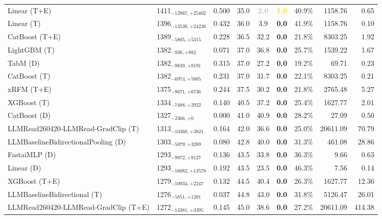 \begin{tabular}{llcccccrr}
Linear (T+E) & 1411${}_{-12867,+25402}$ & 0.500 & 35.0 & \textcolor{silver}{\textbf{2.0}} & \textcolor{gold}{\textbf{1.0}} & 40.9\% & 1158.76 & 0.65 \\
Linear (T) & 1396${}_{-13538,+24236}$ & 0.432 & 36.0 & 3.9 & \textcolor{bronze}{\textbf{0.0}} & 41.9\% & 1158.76 & 0.10 \\
CatBoost (T+E) & 1389${}_{-5805,+5315}$ & 0.228 & 36.5 & 32.2 & \textcolor{bronze}{\textbf{0.0}} & 21.8\% & 8303.25 & 1.92 \\
LightGBM (T) & 1382${}_{-938,+882}$ & 0.071 & 37.0 & 36.8 & \textcolor{bronze}{\textbf{0.0}} & 25.7\% & 1539.22 & 1.67 \\
TabM (D) & 1382${}_{-9839,+8191}$ & 0.315 & 37.0 & 27.2 & \textcolor{bronze}{\textbf{0.0}} & 19.2\% & 69.71 & 0.23 \\
CatBoost (T) & 1382${}_{-6974,+5805}$ & 0.231 & 37.0 & 31.7 & \textcolor{bronze}{\textbf{0.0}} & 22.1\% & 8303.25 & 0.21 \\
xRFM (T+E) & 1375${}_{-8671,+6736}$ & 0.244 & 37.5 & 30.2 & \textcolor{bronze}{\textbf{0.0}} & 21.8\% & 2765.48 & 5.27 \\
XGBoost (T) & 1334${}_{-7488,+2922}$ & 0.140 & 40.5 & 37.2 & \textcolor{bronze}{\textbf{0.0}} & 25.4\% & 1627.77 & 2.01 \\
CatBoost (D) & 1327${}_{-2366,+0}$ & 0.000 & 41.0 & 40.9 & \textcolor{bronze}{\textbf{0.0}} & 28.2\% & 27.09 & 0.50 \\
LLMRead260420-LLMRead-GradClip (T) & 1313${}_{-10368,+3821}$ & 0.164 & 42.0 & 36.6 & \textcolor{bronze}{\textbf{0.0}} & 25.0\% & 20611.09 & 70.79 \\
LLMBaselineBidirectionalPooling (D) & 1303${}_{-5879,+3289}$ & 0.080 & 42.8 & 40.0 & \textcolor{bronze}{\textbf{0.0}} & 31.3\% & 461.08 & 28.86 \\
FastaiMLP (D) & 1293${}_{-9872,+8127}$ & 0.136 & 43.5 & 33.8 & \textcolor{bronze}{\textbf{0.0}} & 36.3\% & 9.66 & 0.63 \\
Linear (D) & 1293${}_{-16082,+13578}$ & 0.192 & 43.5 & 23.5 & \textcolor{bronze}{\textbf{0.0}} & 46.3\% & 7.56 & 0.14 \\
XGBoost (T+E) & 1279${}_{-10934,+2247}$ & 0.132 & 44.5 & 40.4 & \textcolor{bronze}{\textbf{0.0}} & 26.3\% & 1627.77 & 12.36 \\
LLMBaselineBidirectional (T) & 1276${}_{-5851,+1201}$ & 0.037 & 44.8 & 43.0 & \textcolor{bronze}{\textbf{0.0}} & 31.8\% & 5126.47 & 26.01 \\
LLMRead260420-LLMRead-GradClip (T+E) & 1272${}_{-13381,+3395}$ & 0.145 & 45.0 & 38.6 & \textcolor{bronze}{\textbf{0.0}} & 27.2\% & 20611.09 & 414.38 \\

\end{tabular}

